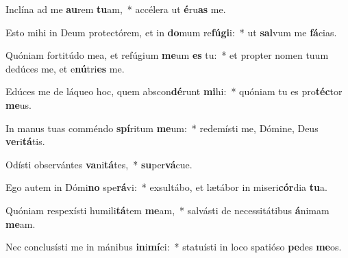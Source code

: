 \item Inclína ad me \textbf{au}rem \textbf{tu}am,~* accélera ut \textbf{é}ru\textbf{as} me.
\item Esto mihi in Deum protectórem, et in \textbf{do}mum re\textbf{fú}\textbf{gi}i:~* ut \textbf{sal}vum me \textbf{fá}cias.
\item Quóniam fortitúdo mea, et refúgium \textbf{me}um \textbf{es} tu:~* et propter nomen tuum dedúces me, et e\textbf{nú}tri\textbf{es} me.
\item Edúces me de láqueo hoc, quem abscon\textbf{dé}runt \textbf{mi}hi:~* quóniam tu es pro\textbf{téc}tor \textbf{me}us.
\item In manus tuas comméndo \textbf{spí}ritum \textbf{me}um:~* redemísti me, Dómine, Deus \textbf{ve}ri\textbf{tá}tis.
\item Odísti observántes \textbf{va}ni\textbf{tá}tes,~* \textbf{su}per\textbf{vá}cue.
\item Ego autem in Dómi\textbf{no} spe\textbf{rá}vi:~* exsultábo, et lætábor in miseri\textbf{cór}dia \textbf{tu}a.
\item Quóniam respexísti humili\textbf{tá}tem \textbf{me}am,~* salvásti de necessitátibus \textbf{á}nimam \textbf{me}am.
\item Nec conclusísti me in mánibus \textbf{in}i\textbf{mí}ci:~* statuísti in loco spatióso \textbf{pe}des \textbf{me}os.
